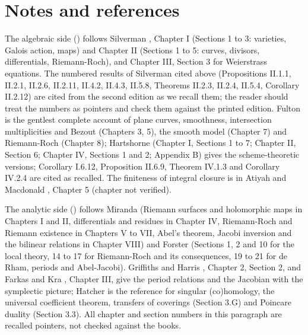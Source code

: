 \section{Notes and references}\label{sec:curves:notes}

The algebraic side () follows
Silverman \cite{SilvermanAEC}, Chapter I (Sections 1 to 3: varieties, Galois action, maps) and Chapter II (Sections 1 to 5: curves, divisors, differentials, Riemann-Roch), and Chapter III,
Section 3 for Weierstrass equations. The numbered results of Silverman cited above (Propositions II.1.1, II.2.1, II.2.6, II.2.11, II.4.2, II.4.3, II.5.8, Theorems II.2.3, II.2.4, II.5.4,
Corollary II.2.12) are cited from the second edition as we recall them; the reader should treat the numbers as pointers and check them against the printed edition. Fulton \cite{Fulton}
is the gentlest complete account of plane curves, smoothness, intersection multiplicities and Bezout (Chapters 3, 5), the smooth model (Chapter 7) and Riemann-Roch (Chapter 8); Hartshorne
\cite{Hartshorne} (Chapter I, Sections 1 to 7; Chapter II, Section 6; Chapter IV, Sections 1 and 2; Appendix B) gives the scheme-theoretic versions; Corollary I.6.12, Proposition II.6.9, Theorem
IV.1.3 and Corollary IV.2.4 are cited as recalled. The finiteness of integral closure is in Atiyah and Macdonald \cite{AtiyahMacdonald}, Chapter 5 (chapter not verified).

The analytic side () follows Miranda \cite{Miranda} (Riemann surfaces and
holomorphic maps in Chapters I and II, differentials and residues in Chapter IV, Riemann-Roch and Riemann existence in Chapters V to VII, Abel's theorem, Jacobi inversion and the
bilinear relations in Chapter VIII) and Forster \cite{Forster81} (Sections 1, 2 and 10 for the local theory, 14 to 17 for Riemann-Roch and its consequences, 19 to 21 for de Rham, periods and
Abel-Jacobi). Griffiths and Harris \cite{GriffithsHarris78}, Chapter 2, Section 2, and Farkas and Kra \cite{FarkasKra92}, Chapter III, give the period relations and the Jacobian with the
symplectic picture; Hatcher \cite{Hatcher02} is the reference for singular (co)homology, the universal coefficient theorem, transfers of coverings (Section 3.G) and Poincare duality (Section
3.3). All chapter and section numbers in this paragraph are recalled pointers, not checked against the books.


